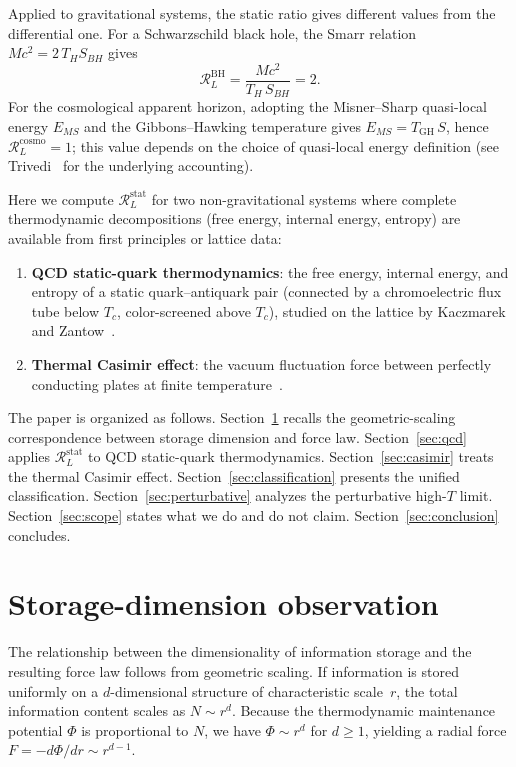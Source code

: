 \documentclass[%
 aip,
 amsmath,amssymb,
 reprint,%
]{revtex4-2}
\newcommand{\RLs}{\mathcal{R}_L^{\mathrm{stat}}}
\begin{document}
Applied to gravitational systems, the static ratio gives different
values from the differential one.  For a Schwarzschild black hole,
the Smarr relation~\cite{Smarr1973}
$Mc^2 = 2\,T_H S_{BH}$ gives
\begin{equation}
\label{eq:RL_BH}
\mathcal{R}_L^{\mathrm{BH}} = \frac{Mc^2}{T_H\,S_{BH}} = 2.
\end{equation}
For the cosmological apparent horizon, adopting the Misner--Sharp
quasi-local energy $E_{MS}$ and the Gibbons--Hawking temperature
gives $E_{MS} = T_{\mathrm{GH}}\,S$, hence
$\mathcal{R}_L^{\mathrm{cosmo}} = 1$; this value depends on the
choice of quasi-local energy definition (see
Trivedi~\cite{Trivedi2024} for the underlying accounting).

Here we compute $\RLs$ for two non-gravitational
systems where complete thermodynamic decompositions (free energy,
internal energy, entropy) are available from first principles or
lattice data:
\begin{enumerate}
\item \textbf{QCD static-quark thermodynamics}: the free energy,
internal energy, and entropy of a static quark--antiquark pair
(connected by a chromoelectric flux tube below $T_c$, color-screened
above $T_c$), studied on the lattice by Kaczmarek and
Zantow~\cite{KZ2005a,KZ2005b}.
\item \textbf{Thermal Casimir effect}: the vacuum fluctuation force
between perfectly conducting plates at finite
temperature~\cite{Casimir1948,Lifshitz1956}.
\end{enumerate}

The paper is organized as follows.
Section~\ref{sec:storage_dim} recalls the geometric-scaling
correspondence between storage dimension and force law.
Section~\ref{sec:qcd} applies $\mathcal{R}_L^{\mathrm{stat}}$ to
QCD static-quark thermodynamics.
Section~\ref{sec:casimir} treats the thermal Casimir effect.
Section~\ref{sec:classification} presents the unified classification.
Section~\ref{sec:perturbative} analyzes the perturbative high-$T$
limit.
Section~\ref{sec:scope} states what we do and do not claim.
Section~\ref{sec:conclusion} concludes.


\section{Storage-dimension observation}
\label{sec:storage_dim}

The relationship between the dimensionality of information storage
and the resulting force law follows from geometric scaling.
If information is stored uniformly on a $d$-dimensional structure
of characteristic scale~$r$, the total information content scales
as $N \sim r^d$.  Because the thermodynamic maintenance potential
$\Phi$ is proportional to $N$, we have $\Phi \sim r^d$ for
$d \geq 1$, yielding a radial force
$F = -d\Phi/dr \sim r^{d-1}$.
\end{document}
